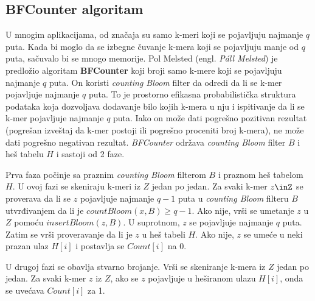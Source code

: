 \documentclass[12pt,oneside]{memoir}
\begin{document}
\subsection{BFCounter algoritam}
U mnogim aplikacijama, od značaja su samo k-meri koji se pojavljuju najmanje $q$ puta. Kada bi moglo da se izbegne čuvanje k-mera koji se pojavljuju manje od $q$ puta, sačuvalo bi se mnogo memorije. Pol Melsted (engl. \textit{Páll Melsted}) je predložio algoritam  \textbf{BFCounter} koji broji samo k-mere koji se pojavljuju najmanje $q$ puta. On koristi \textit{counting Bloom} filter da odredi da li se k-mer pojavljuje najmanje $q$ puta. To je prostorno efikasna probabilistička struktura podataka koja dozvoljava dodavanje bilo kojih k-mera u nju i ispitivanje da li se k-mer pojavljuje najmanje $q$ puta. Iako on može dati pogrešno pozitivan rezultat (pogrešan izveštaj da k-mer postoji ili pogrešno proceniti broj k-mera), ne može dati pogrešno negativan rezultat. \textit{BFCounter} održava \textit{counting Bloom} filter $B$ i heš tabelu $H$ i sastoji od 2 faze. 

Prva faza počinje sa praznim \textit{counting Bloom} filterom $B$ i praznom heš tabelom $H$. U ovoj fazi se skeniraju k-meri iz $Z$ jedan po jedan. Za svaki k-mer $z\inZ$ se proverava da li se $z$ pojavljuje najmanje $q - 1$ puta u \textit{counting Bloom} filteru $B$ utvrđivanjem da li je $countBloom(x, B) \geq q-1$. Ako nije, vrši se umetanje $z$ u $Z$ pomoću $insertBloom(z, B)$. U suprotnom, $z$ se pojavljuje najmanje $q$ puta. Zatim se vrši proveravanje da li je $z$ u heš tabeli $H$. Ako nije, $z$ se umeće u neki prazan ulaz $H[i]$ i postavlja se $Count[i]$ na 0. 

U drugoj fazi se obavlja stvarno brojanje. Vrši se skeniranje k-mera iz $Z$ jedan po jedan. Za svaki k-mer $z$ iz $Z$, ako se $z$ pojavljuje u heširanom ulazu $H[i]$, onda se uvećava $Count[i]$ za 1.

\begin{comment}

Detaljan pseudokod je prikazan na slici \ref{fig:7}:

\begin{figure}[h]
\centering
\texttt{[image: BFCounter5\_10.PNG]}
\caption{Prostorno efikasan algoritam za prebrojavanje k-mera koji broji samo k-mere koji se pojavljuju najmanje q puta.}
\label{fig:7}
\source{\cite{WingKinSung} str. 134, slika 5.10}
\end{figure}

\end{comment}
\end{document}
